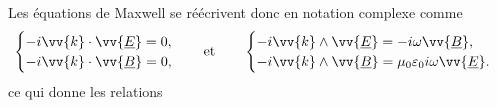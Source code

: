 \documentclass[12pt,fancy]{cours}
\begin{document}
Les équations de Maxwell se réécrivent donc en notation complexe comme
\begin{equation}
\begin{cases}
  -i\vv{k}\cdot\vv{\underline{E}}= 0,\\
- i\vv{k}\cdot\vv{\underline{B}}=0, 
\end{cases}\quad\text{et}\qquad
\begin{cases} 
-i\vv{k}\pv\vv{\underline{E}}=-i\omega\vv{\underline{B}},\\
-i\vv{k}\pv\vv{\underline{B}}=\mu_0 \epz i\omega\vv{\underline{E}}.
\end{cases}
\end{equation}
ce qui donne les relations
\end{document}
